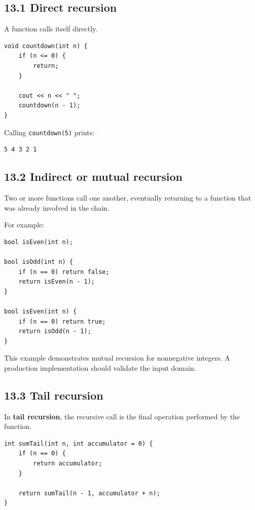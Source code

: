 \subsection{13.1 Direct recursion}

A function calls itself directly.

\begin{lstlisting}[style=cppstyle]
void countdown(int n) {
    if (n <= 0) {
        return;
    }

    cout << n << " ";
    countdown(n - 1);
}
\end{lstlisting}

Calling \texttt{countdown(5)} prints:

\begin{lstlisting}[style=pseudocode]
5 4 3 2 1
\end{lstlisting}

\subsection{13.2 Indirect or mutual recursion}

Two or more functions call one another, eventually returning to a function that was already involved in the chain.

For example:

\begin{lstlisting}[style=cppstyle]
bool isEven(int n);

bool isOdd(int n) {
    if (n == 0) return false;
    return isEven(n - 1);
}

bool isEven(int n) {
    if (n == 0) return true;
    return isOdd(n - 1);
}
\end{lstlisting}

This example demonstrates mutual recursion for nonnegative integers. A production implementation should validate the input domain.

\subsection{13.3 Tail recursion}

In \textbf{tail recursion}, the recursive call is the final operation performed by the function.

\begin{lstlisting}[style=cppstyle]
int sumTail(int n, int accumulator = 0) {
    if (n == 0) {
        return accumulator;
    }

    return sumTail(n - 1, accumulator + n);
}
\end{lstlisting}

